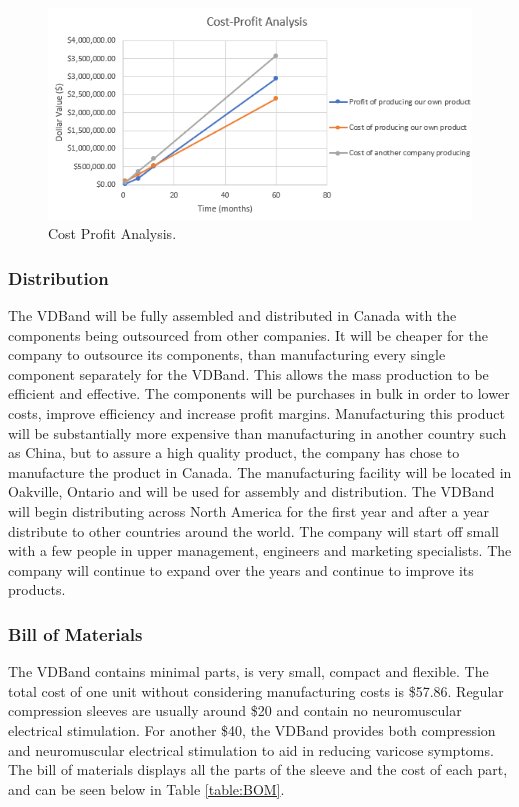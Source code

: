 \documentclass[11.5pt]{article}
\begin{document}
\begin{figure}[H]
    \centering
    \includegraphics[width=1.0\linewidth]{marketing/CPG.PNG}
    \caption{Cost Profit Analysis.}
    \label{fig:CPAG}
\end{figure}
\vspace{0.5mm}

\subsubsection{Distribution}
The VDBand will be fully assembled and distributed in Canada with the components being outsourced from other companies. It will be cheaper for the company to outsource its components, than manufacturing every single component separately for the VDBand. This allows the mass production to be efficient and effective. The components will be purchases in bulk in order to lower costs, improve efficiency and increase profit margins. Manufacturing this product will be substantially more expensive than manufacturing in another country such as China, but to assure a high quality product, the company has chose to manufacture the product in Canada. The manufacturing facility will be located in Oakville, Ontario and will be used for assembly and distribution. The VDBand will begin distributing across North America for the first year and after a year distribute to other countries around the world. The company will start off small with a few people in upper management, engineers and marketing specialists. The company will continue to expand over the years and continue to improve its products. 


\subsubsection{Bill of Materials}
The VDBand contains minimal parts, is very small, compact and flexible. The total cost of one unit without considering manufacturing costs is \$57.86. Regular compression sleeves are usually around \$20 and contain no neuromuscular electrical stimulation. For another \$40, the VDBand provides both compression and neuromuscular electrical stimulation to aid in reducing varicose symptoms. The bill of materials displays all the parts of the sleeve and the cost of each part, and can be seen below in Table \ref{table:BOM}.
\end{document}
